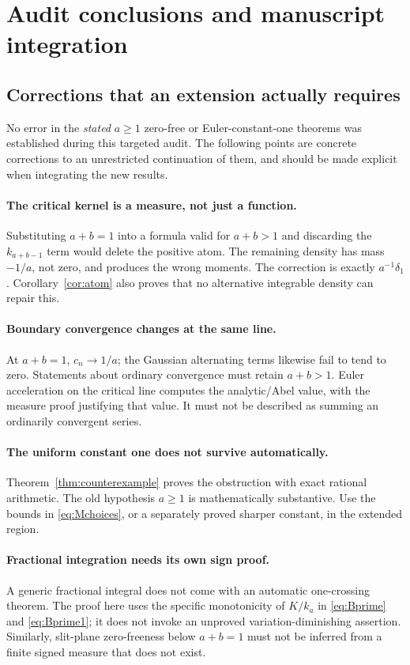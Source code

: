 \documentclass[11pt]{article}
\numberwithin{equation}{section}
\theoremstyle{definition}\newtheorem{definition}[theorem]{Definition}
\theoremstyle{remark}\newtheorem{remark}[theorem]{Remark}
\begin{document}
\section{Audit conclusions and manuscript integration}
\label{sec:audit}

\subsection{Corrections that an extension actually requires}
No error in the \emph{stated} $a\ge1$ zero-free or Euler-constant-one
theorems was established during this targeted audit. The following
points are concrete corrections to an unrestricted continuation of
them, and should be made explicit when integrating the new results.

\paragraph{The critical kernel is a measure, not just a function.}
Substituting $a+b=1$ into a formula valid for $a+b>1$ and discarding
the $k_{a+b-1}$ term would delete the positive atom. The remaining
density has mass $-1/a$, not zero, and produces the wrong moments.
The correction is exactly $a^{-1}\delta_1$. Corollary~\ref{cor:atom}
also proves that no alternative integrable density can repair this.

\paragraph{Boundary convergence changes at the same line.}
At $a+b=1$, $c_n\to1/a$; the Gaussian alternating terms likewise
fail to tend to zero. Statements about ordinary convergence must
retain $a+b>1$. Euler acceleration on the critical line computes
the analytic/Abel value, with the measure proof justifying that value.
It must not be described as summing an ordinarily convergent series.

\paragraph{The uniform constant one does not survive automatically.}
Theorem~\ref{thm:counterexample} proves the obstruction with exact
rational arithmetic. The old hypothesis $a\ge1$ is mathematically
substantive. Use the bounds in \eqref{eq:Mchoices}, or a separately
proved sharper constant, in the extended region.

\paragraph{Fractional integration needs its own sign proof.}
A generic fractional integral does not come with an automatic
one-crossing theorem. The proof here uses the specific monotonicity
of $K/k_a$ in \eqref{eq:Bprime} and \eqref{eq:Bprime1}; it does not
invoke an unproved variation-diminishing assertion. Similarly,
slit-plane zero-freeness below $a+b=1$ must not be inferred from a
finite signed measure that does not exist.
\end{document}
